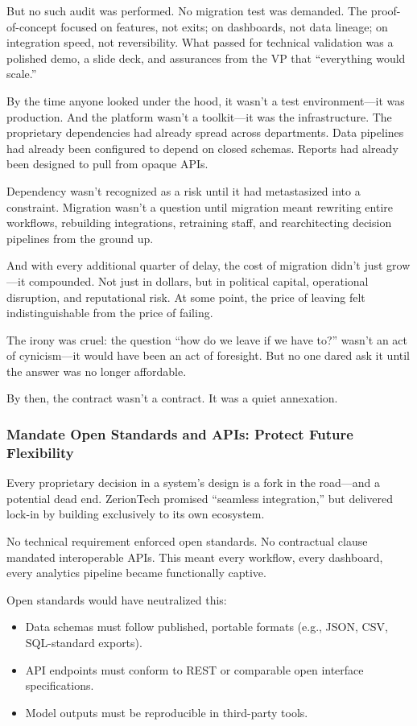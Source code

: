 But no such audit was performed. No migration test was demanded. The proof-of-concept focused on features, not exits; on dashboards, not data lineage; on integration speed, not reversibility. What passed for technical validation was a polished demo, a slide deck, and assurances from the VP that “everything would scale.”

By the time anyone looked under the hood, it wasn’t a test environment—it was production. And the platform wasn’t a toolkit—it was the infrastructure. The proprietary dependencies had already spread across departments. Data pipelines had already been configured to depend on closed schemas. Reports had already been designed to pull from opaque APIs.

Dependency wasn’t recognized as a risk until it had metastasized into a constraint. Migration wasn’t a question until migration meant rewriting entire workflows, rebuilding integrations, retraining staff, and rearchitecting decision pipelines from the ground up.

And with every additional quarter of delay, the cost of migration didn’t just grow—it compounded. Not just in dollars, but in political capital, operational disruption, and reputational risk. At some point, the price of leaving felt indistinguishable from the price of failing.

The irony was cruel: the question “how do we leave if we have to?” wasn’t an act of cynicism—it would have been an act of foresight. But no one dared ask it until the answer was no longer affordable.

By then, the contract wasn’t a contract. It was a quiet annexation.


\subsubsection{Mandate Open Standards and APIs: Protect Future Flexibility}

Every proprietary decision in a system’s design is a fork in the road—and a potential dead end. ZerionTech promised “seamless integration,” but delivered lock-in by building exclusively to its own ecosystem.  

No technical requirement enforced open standards. No contractual clause mandated interoperable APIs. This meant every workflow, every dashboard, every analytics pipeline became functionally captive.  

Open standards would have neutralized this:  
\begin{itemize}
    \item Data schemas must follow published, portable formats (e.g., JSON, CSV, SQL-standard exports).
    \item API endpoints must conform to REST or comparable open interface specifications.
    \item Model outputs must be reproducible in third-party tools.
\end{itemize}

